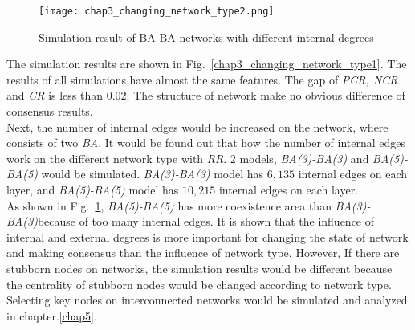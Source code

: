 \begin{figure}[!htb]
	\centering
	\texttt{[image: chap3\_changing\_network\_type2.png]}
	\caption{Simulation result of BA-BA networks with different internal degrees}
	\label{chap3_changing_network_type2}
\end{figure}
The simulation results are shown in Fig.~\ref{chap3_changing_network_type1}. The results of all simulations have almost the same features. The gap of \textit{PCR, NCR} and \textit{CR} is less than $0.02$. The structure of network make no obvious difference of consensus results. \\
Next, the number of internal edges would be increased on the network, where consists of two \textit{BA}. It would be found out that how the number of internal edges work on the different network type with \textit{RR}. $2$ models, \textit{BA(3)-BA(3)} and \textit{BA(5)-BA(5)} would be simulated. \textit{BA(3)-BA(3)} model has $6,135$ internal edges on each layer, and \textit{BA(5)-BA(5)} model has $10,215$ internal edges on each layer. \\

As shown in Fig.~\ref{chap3_changing_network_type2}, \textit{BA(5)-BA(5)} has more coexistence area than \textit{BA(3)-BA(3)}because of too many internal edges. It is shown that the influence of internal and external degrees is more important for changing the state of network and making consensus than the influence of network type. However, If there are stubborn nodes on networks, the simulation results would be different because the centrality of stubborn nodes would be changed according to network type. Selecting key nodes on interconnected networks would be simulated and analyzed in chapter.\ref{chap5}.\\

